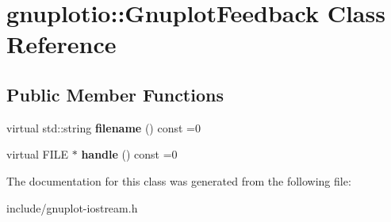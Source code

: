 \hypertarget{classgnuplotio_1_1GnuplotFeedback}{}\section{gnuplotio\+:\+:Gnuplot\+Feedback Class Reference}
\label{classgnuplotio_1_1GnuplotFeedback}
\subsection*{Public Member Functions}
\begin{DoxyCompactItemize}
\item 
\mbox{\label{classgnuplotio_1_1GnuplotFeedback_a081d4d59ffd81e2322c07c0a802e1307}} 
virtual std\+::string {\bfseries filename} () const =0
\item 
\mbox{\label{classgnuplotio_1_1GnuplotFeedback_a13ae87ba489bfbe87f64b8b54e8a4563}} 
virtual F\+I\+LE $\ast$ {\bfseries handle} () const =0
\end{DoxyCompactItemize}


The documentation for this class was generated from the following file\+:\begin{DoxyCompactItemize}
\item 
include/gnuplot-\/iostream.\+h\end{DoxyCompactItemize}
